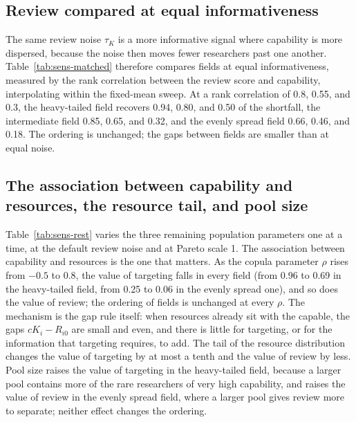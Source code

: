 

\subsection*{Review compared at equal informativeness}
The same review noise $\tau_K$ is a more informative signal where capability is more dispersed, because the noise then moves fewer researchers past one another. Table~\ref{tab:sens-matched} therefore compares fields at equal informativeness, measured by the rank correlation between the review score and capability, interpolating within the fixed-mean sweep. At a rank correlation of 0.8, 0.55, and 0.3, the heavy-tailed field recovers 0.94, 0.80, and 0.50 of the shortfall, the intermediate field 0.85, 0.65, and 0.32, and the evenly spread field 0.66, 0.46, and 0.18. The ordering is unchanged; the gaps between fields are smaller than at equal noise.



\subsection*{The association between capability and resources, the resource tail, and pool size}
Table~\ref{tab:sens-rest} varies the three remaining population parameters one at a time, at the default review noise and at Pareto scale 1. The association between capability and resources is the one that matters. As the copula parameter $\rho$ rises from $-0.5$ to $0.8$, the value of targeting falls in every field (from 0.96 to 0.69 in the heavy-tailed field, from 0.25 to 0.06 in the evenly spread one), and so does the value of review; the ordering of fields is unchanged at every $\rho$. The mechanism is the gap rule itself: when resources already sit with the capable, the gaps $cK_i - R_{i0}$ are small and even, and there is little for targeting, or for the information that targeting requires, to add. The tail of the resource distribution changes the value of targeting by at most a tenth and the value of review by less. Pool size raises the value of targeting in the heavy-tailed field, because a larger pool contains more of the rare researchers of very high capability, and raises the value of review in the evenly spread field, where a larger pool gives review more to separate; neither effect changes the ordering.



